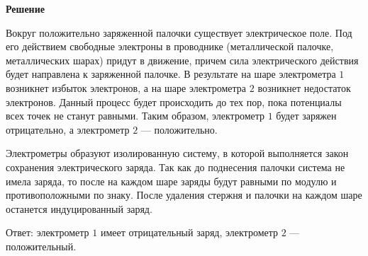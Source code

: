 \documentclass[12pt,a4paper]{article}
\begin{document}
{\begin{center}\end{center}
\par
}{
\smallskip\noindent\textbf{Решение}\par
Вокруг положительно заряженной палочки существует электрическое поле. Под его действием свободные электроны в проводнике (металлической палочке, металлических шарах) придут в движение, причем сила электрического действия будет направлена к заряженной палочке. В результате на шаре электрометра $1$ возникнет избыток электронов, а на шаре электрометра $2$ возникнет недостаток электронов. Данный процесс будет происходить до тех пор, пока потенциалы всех точек не станут равными. Таким образом, электрометр $1$ будет заряжен отрицательно, а электрометр $2$ — положительно.\par
Электрометры образуют изолированную систему, в которой выполняется закон сохранения электрического заряда. Так как до поднесения палочки система не имела заряда, то после на каждом шаре заряды будут равными по модулю и противоположными по знаку. После удаления стержня и палочки на каждом шаре останется индуцированный заряд.\par
Ответ: электрометр $1$ имеет отрицательный заряд, электрометр $2$ — положительный.\par
}
\end{document}
